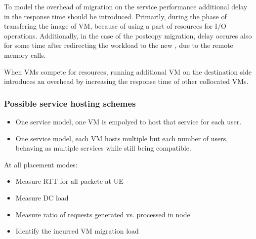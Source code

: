
To model the overhead of migration on the service performance additional delay in the response time should be introduced.
Primarily, during the phase of transfering the image of VM, because of using a part of resources for I/O operations.
Additionally, in the case of the postcopy migration, delay occures also for some time after redirecting the workload to the new \dc, due to the remote memory calls.

When VMs compete for resources, running additional VM on the destination side introduces an overhead by increasing the response time of other collocated VMs.  

\subsubsection{Possible service hosting schemes}

\begin{itemize}
\item One service model, one VM is empolyed to host that service for each user.
\item One service model, each VM hosts multiple but each number of users, behaving as multiple services while still being compatible.
\end{itemize}


At all placement modes:
\begin{itemize}
\item Measure RTT for all packetc at UE
\item Measure DC load
\item Measure ratio of requests generated vs. processed in \xcloud node
\item Identify the incurred VM migration load
\end{itemize}